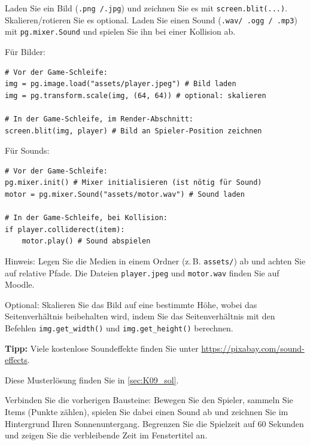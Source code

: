 \begin{myexercise}\label{myexercise:Medien}
    Laden Sie ein Bild (\lstinline|.png /.jpg|) und zeichnen Sie es mit \lstinline|screen.blit(...)|. Skalieren/rotieren Sie es optional. Laden Sie einen Sound (\lstinline|.wav/ .ogg / .mp3|) mit \lstinline|pg.mixer.Sound| und spielen Sie ihn bei einer Kollision ab.

    Für Bilder:
    \begin{lstlisting}
# Vor der Game-Schleife:
img = pg.image.load("assets/player.jpeg") # Bild laden
img = pg.transform.scale(img, (64, 64)) # optional: skalieren

# In der Game-Schleife, im Render-Abschnitt:
screen.blit(img, player) # Bild an Spieler-Position zeichnen
\end{lstlisting}

    Für Sounds:
    \begin{lstlisting}
# Vor der Game-Schleife:
pg.mixer.init() # Mixer initialisieren (ist nötig für Sound)
motor = pg.mixer.Sound("assets/motor.wav") # Sound laden

# In der Game-Schleife, bei Kollision:
if player.colliderect(item):
    motor.play() # Sound abspielen
\end{lstlisting}

    Hinweis: Legen Sie die Medien in einem Ordner (z.\,B. \lstinline|assets/|) ab und achten Sie auf relative Pfade. Die Dateien \texttt{player.jpeg} und \texttt{motor.wav} finden Sie auf Moodle.

    Optional: Skalieren Sie das Bild auf eine bestimmte Höhe, wobei das Seitenverhältnis beibehalten wird, indem Sie das Seitenverhältnis mit den Befehlen \lstinline|img.get_width()| und \lstinline|img.get_height()| berechnen.

    \textbf{Tipp:} Viele kostenlose Soundeffekte finden Sie unter \url{https://pixabay.com/sound-effects}.
	\begin{myanswer}
		Diese Musterlösung finden Sie in \cref{sec:K09_sol}.
	\end{myanswer}
\end{myexercise}

\begin{mychallenge}
    Verbinden Sie die vorherigen Bausteine: Bewegen Sie den Spieler, sammeln Sie Items (Punkte zählen), spielen Sie dabei einen Sound ab und zeichnen Sie im Hintergrund Ihren Sonnenuntergang. Begrenzen Sie die Spielzeit auf 60 Sekunden und zeigen Sie die verbleibende Zeit im Fenstertitel an.
\end{mychallenge}

